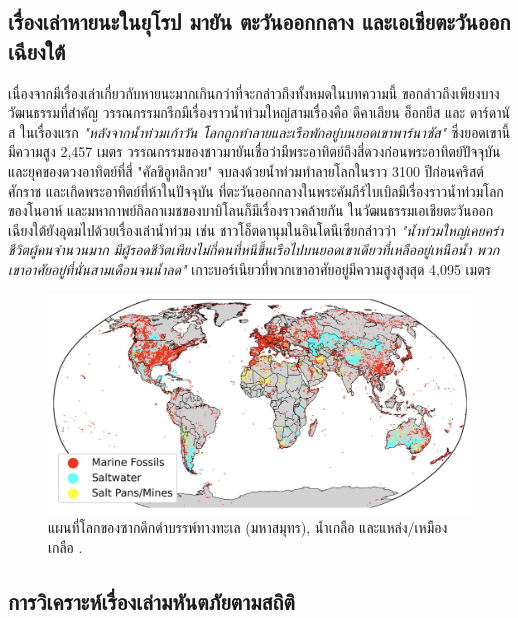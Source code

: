 \documentclass[10pt,twocolumn,letterpaper]{article}
\begin{document}
\subsection{เรื่องเล่าหายนะในยุโรป มายัน ตะวันออกกลาง และเอเชียตะวันออกเฉียงใต้}

เนื่องจากมีเรื่องเล่าเกี่ยวกับหายนะมากเกินกว่าที่จะกล่าวถึงทั้งหมดในบทความนี้ ขอกล่าวถึงเพียงบางวัฒนธรรมที่สำคัญ วรรณกรรมกรีกมีเรื่องราวน้ำท่วมใหญ่สามเรื่องคือ ดีคาเลียน อ็อกยีส และ ดาร์ดานัส \cite{9,10} ในเรื่องแรก \textit{"หลังจากน้ำท่วมเก้าวัน โลกถูกทำลายและเรือพักอยู่บนยอดเขาพาร์นาซัส"} ซึ่งยอดเขานี้มีความสูง 2,457 เมตร \cite{11} วรรณกรรมของชาวมายันเชื่อว่ามีพระอาทิตย์ถึงสี่ดวงก่อนพระอาทิตย์ปัจจุบัน และยุคของดวงอาทิตย์ที่สี่ "คัลชิอูทลิกวย" จบลงด้วยน้ำท่วมทำลายโลกในราว 3100 ปีก่อนคริสต์ศักราช และเกิดพระอาทิตย์ที่ห้าในปัจจุบัน \cite{12} ที่ตะวันออกกลางในพระคัมภีร์ไบเบิลมีเรื่องราวน้ำท่วมโลกของโนอาห์ และมหากาพย์กิลกาเมชของบาบิโลนก็มีเรื่องราวคล้ายกัน \cite{13} ในวัฒนธรรมเอเชียตะวันออกเฉียงใต้ยังอุดมไปด้วยเรื่องเล่าน้ำท่วม เช่น ชาวโอ็ตดานุมในอินโดนีเซียกล่าวว่า \textit{"น้ำท่วมใหญ่เคยคร่าชีวิตผู้คนจำนวนมาก มีผู้รอดชีวิตเพียงไม่กี่คนที่หนีขึ้นเรือไปบนยอดเขาเดียวที่เหลืออยู่เหนือน้ำ พวกเขาอาศัยอยู่ที่นั่นสามเดือนจนน้ำลด"} \cite{3} เกาะบอร์เนียวที่พวกเขาอาศัยอยู่มีความสูงสูงสุด 4,095 เมตร

\begin{figure}[b]
\begin{center}
\includegraphics[width=1\textwidth]{marine.jpg}
\end{center}
   \caption{แผนที่โลกของซากดึกดำบรรพ์ทางทะเล (มหาสมุทร), น้ำเกลือ และแหล่ง/เหมืองเกลือ \cite{15,16,86,87}.}
   \label{fig:2}
\end{figure}

\subsection{การวิเคราะห์เรื่องเล่ามหันตภัยตามสถิติ}
\end{document}
